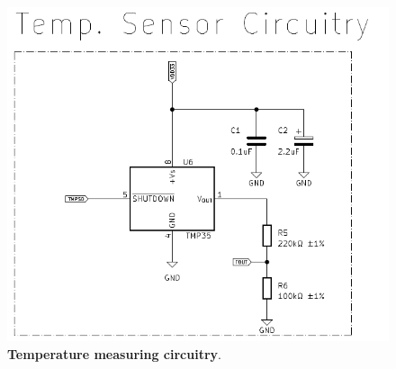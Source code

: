 \begin{figure}[H]
    \centering
    \includegraphics[scale = 0.6]{imagens/temperatureSensorCircuitry.png}
    \caption{\textbf{Temperature measuring circuitry}.}
    \label{02fig:temperatureSensorCircuitry}
\end{figure}














